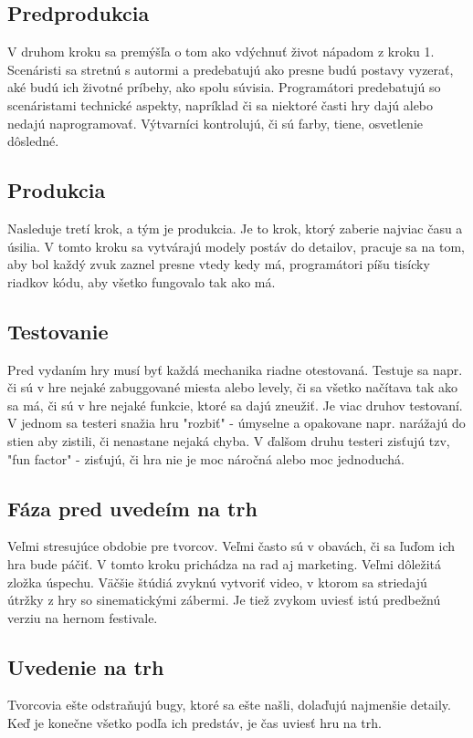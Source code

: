 \documentclass[10pt,twoside,slovak,a4paper]{article}
\begin{document}
\subsection{Predprodukcia}
V druhom kroku sa premýšľa o tom ako vdýchnuť život nápadom z kroku 1. Scenáristi sa stretnú s autormi a predebatujú ako presne budú postavy vyzerať, aké budú ich životné príbehy, ako spolu súvisia. Programátori predebatujú so scenáristami technické aspekty, napríklad či sa niektoré časti hry dajú alebo nedajú naprogramovať. Výtvarníci kontrolujú, či sú farby, tiene, osvetlenie dôsledné. 

\subsection{Produkcia}
Nasleduje tretí krok, a tým je produkcia. Je to krok, ktorý zaberie najviac času a úsilia. V tomto kroku sa vytvárajú modely postáv do detailov, pracuje sa na tom, aby bol každý zvuk zaznel presne vtedy kedy má, programátori píšu tisícky riadkov kódu, aby všetko fungovalo tak ako má. 

\subsection{Testovanie}
Pred vydaním hry musí byť každá mechanika riadne otestovaná. Testuje sa napr. či sú v hre nejaké zabuggované miesta alebo levely, či sa všetko načítava tak ako sa má, či sú v hre nejaké funkcie, ktoré sa dajú zneužiť. Je viac druhov testovaní. V jednom sa testeri snažia hru "rozbiť" - úmyselne a opakovane napr. narážajú do stien aby zistili, či nenastane nejaká chyba. V ďalšom druhu testeri zisťujú tzv, "fun factor" - zisťujú, či hra nie je moc náročná alebo moc jednoduchá.

\subsection{Fáza pred uvedeím na trh}
Veľmi stresujúce obdobie pre tvorcov. Veľmi často sú v obavách, či sa ľuďom ich hra bude páčiť. V tomto kroku prichádza na rad aj marketing. Veľmi dôležitá zložka úspechu. Väčšie štúdiá zvyknú vytvoriť video, v ktorom sa striedajú útržky z hry so sinematickými zábermi. Je tiež zvykom uviesť istú predbežnú verziu na hernom festivale.

\subsection{Uvedenie na trh}
Tvorcovia ešte odstraňujú bugy, ktoré sa ešte našli, dolaďujú najmenšie detaily. Keď je konečne všetko podľa ich predstáv, je čas uviesť hru na trh.
\end{document}
